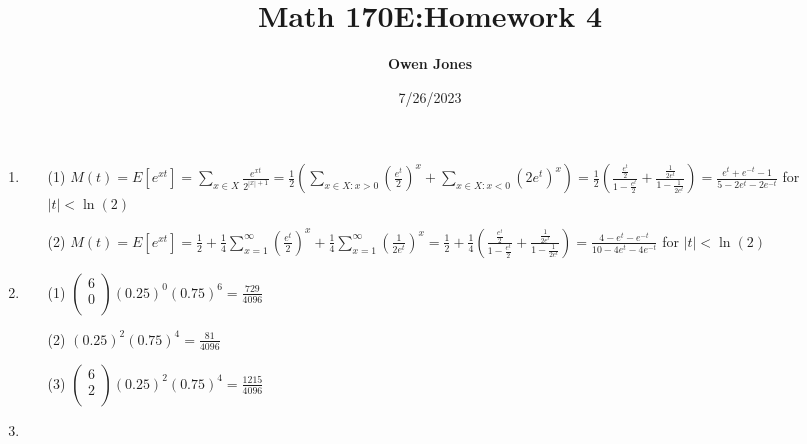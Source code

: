 \documentclass{article}
\title{\bf Math 170E:\@ Homework 4}
\date{7/26/2023}
\author{\bf Owen Jones}
\begin{document}
\maketitle

\begin{enumerate}[label=\textbf{Problem \arabic*.}]
    \item \begin{itemize}
        \item [(1)] $\displaystyle M(t)=E[e^{xt}]=\sum_{x \in X} \frac{e^{xt}}{2^{|x|+1}}=\frac{1}{2}(\sum_{x\in X:x>0}{(\frac{e^t}{2})}^x+\sum_{x\in X:x<0}{(2e^t)}^x)=\frac{1}{2}(\frac{\frac{e^t}{2}}{1-\frac{e^t}{2}}+\frac{\frac{1}{2e^t}}{1-\frac{1}{2e^t}})=\frac{e^t+e^{-t}-1}{5-2e^t-2e^{-t}}$ for $|t|<\ln(2)$
        \item [(2)] $\displaystyle M(t)=E[e^{xt}]=\frac{1}{2}+\frac{1}{4}\sum_{x=1}^{\infty}{(\frac{e^t}{2})}^x+\frac{1}{4}\sum_{x=1}^{\infty}{(\frac{1}{2e^t})}^x=\frac{1}{2}+\frac{1}{4}(\frac{\frac{e^t}{2}}{1-\frac{e^t}{2}}+\frac{\frac{1}{2e^t}}{1-\frac{1}{2e^t}})=\frac{4-e^t-e^{-t}}{10-4e^t-4e^{-t}}$ for $|t|<\ln(2)$
    \end{itemize}
    \item \begin{itemize}
        \item [(1)] $\begin{pmatrix}
           6\\
           0\\ 
        \end{pmatrix}{(0.25)}^0{(0.75)}^6=\frac{729}{4096}$
        \item [(2)] ${(0.25)}^2{(0.75)}^4=\frac{81}{4096}$
        \item [(3)] $\begin{pmatrix}
            6\\
            2\\ 
         \end{pmatrix}{(0.25)}^2{(0.75)}^4=\frac{1215}{4096}$
    \end{itemize}
    \item {}
\end{enumerate}
\end{document}
